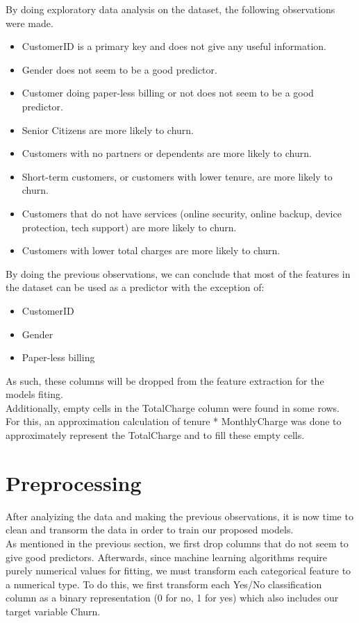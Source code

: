 \documentclass[letterpaper, 10 pt, conference]{ieeeconf}
\begin{document}
By doing exploratory data analysis on the dataset, the following observations were made.
\begin{itemize}
    \item CustomerID is a primary key and does not give any useful information.
    \item Gender does not seem to be a good predictor.
    \item Customer doing paper-less billing or not does not seem to be a good predictor.
    \item Senior Citizens are more likely to churn.
    \item Customers with no partners or dependents are more likely to churn.
    \item Short-term customers, or customers with lower tenure, are more likely to churn.
    \item Customers that do not have services (online security, online backup, device protection, tech support) are more likely to churn.
    \item Customers with lower total charges are more likely to churn.
\end{itemize}
By doing the previous observations, we can conclude that most of the features in the dataset can be used as a predictor with the exception of:
\begin{itemize}
    \item CustomerID
    \item Gender
    \item Paper-less billing
\end{itemize}

As such, these columns will be dropped from the feature extraction for the models fiting. \\

Additionally, empty cells in the TotalCharge column were found in some rows. For this, an approximation calculation of tenure * MonthlyCharge was done
to approximately represent the TotalCharge and to fill these empty cells.

\section{ Preprocessing}
After analyizing the data and making the previous observations, it is now time to clean and transorm the data 
in order to train our proposed models. \\

As mentioned in the previous section, we first drop columns that do not seem to give good predictors. Afterwards, since machine learning 
algorithms require purely numerical values for fitting, we must transform each categorical feature to a numerical type. To do this, we first
transform each Yes/No classification column as a binary representation (0 for no, 1 for yes) which also includes our target variable Churn.  \\
\end{document}
